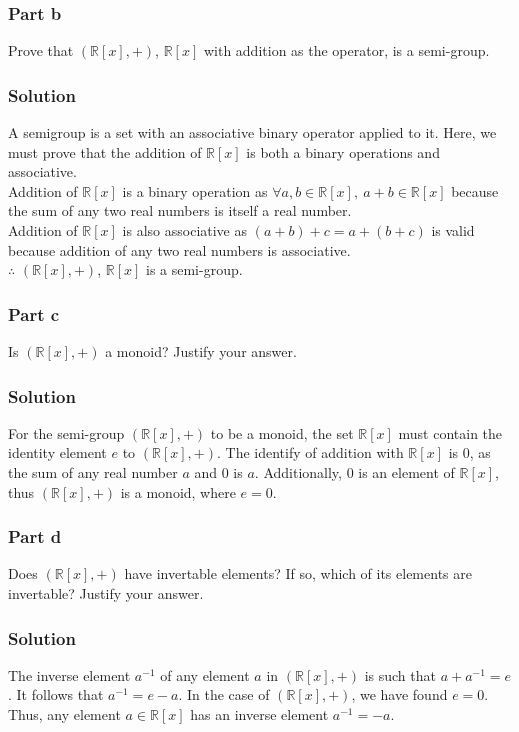 \documentclass[12pt]{article}
\begin{document}
\subsubsection*{Part b}

Prove that $(\mathbb{R}[x], +)$, $\mathbb{R}[x]$ with addition as the operator, is a semi-group.

\subsubsection*{Solution}

A semigroup is a set with an associative binary operator applied to it. Here, we must prove that the addition of $\mathbb{R}[x]$ is
both a binary operations and associative.\\
\null\newline
Addition of $\mathbb{R}[x]$ is a binary operation as $\forall a,b \in \mathbb{R}[x],\ a + b \in \mathbb{R}[x]$ because the sum of any two real numbers is itself a real number.\\
Addition of $\mathbb{R}[x]$ is also associative as $(a + b) + c = a + (b + c)$ is valid because addition of any two real numbers is associative.\\
\null\newline
$\therefore$ $(\mathbb{R}[x], +)$, $\mathbb{R}[x]$ is a semi-group.

\pagebreak
\subsubsection*{Part c}

Is $(\mathbb{R}[x], +)$ a monoid? Justify your answer.

\subsubsection*{Solution}

For the semi-group $(\mathbb{R}[x], +)$ to be a monoid, the set $\mathbb{R}[x]$ must contain the identity element $e$ to $(\mathbb{R}[x], +)$.
The identify of addition with $\mathbb{R}[x]$ is $0$, as the sum of any real number $a$ and $0$ is $a$.
Additionally, $0$ is an element of $\mathbb{R}[x]$, thus $(\mathbb{R}[x], +)$ is a monoid, where $e = 0$.

\subsubsection*{Part d}

Does $(\mathbb{R}[x], +)$ have invertable elements? If so, which of its elements are invertable? Justify your answer.

\subsubsection*{Solution}

The inverse element $a^{-1}$ of any element $a$ in $(\mathbb{R}[x], +)$ is such that $a + a^{-1} = e$. It follows that $a^{-1} = e - a$.
In the case of $(\mathbb{R}[x], +)$, we have found $e = 0$. Thus, any element $a \in \mathbb{R}[x]$ has an inverse element $a^{-1} = -a$.

\pagebreak
\end{document}
